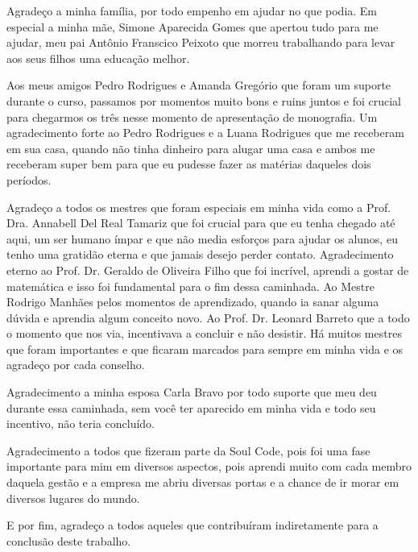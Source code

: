 


\begin{agradecimentos}







Agradeço a minha família, por todo empenho em ajudar no que podia. Em especial a minha mãe, Simone Aparecida Gomes que apertou tudo para me ajudar, meu pai Antônio Franscico Peixoto que morreu trabalhando para levar aos seus filhos uma educação melhor.

Aos meus amigos Pedro Rodrigues e Amanda Gregório que foram um suporte durante o curso, passamos por momentos muito bons e ruins juntos e foi crucial para chegarmos os três nesse momento de apresentação de monografia. Um agradecimento forte ao Pedro Rodrigues e a Luana Rodrigues que me receberam em sua casa, quando não tinha dinheiro para alugar uma casa e ambos me receberam super bem para que eu pudesse fazer as matérias daqueles dois períodos.

Agradeço a todos os mestres que foram especiais em minha vida como a Prof. Dra. Annabell Del Real Tamariz que foi crucial para que eu tenha chegado até aqui, um ser humano ímpar e que não media esforços para ajudar os alunos, eu tenho uma gratidão eterna e que jamais desejo perder contato. Agradecimento eterno ao Prof. Dr. Geraldo de Oliveira Filho que foi incrível, aprendi a gostar de matemática e isso foi fundamental para o fim dessa caminhada. Ao Mestre Rodrigo Manhães pelos momentos de aprendizado, quando ia sanar alguma dúvida e aprendia algum conceito novo. Ao Prof. Dr. Leonard Barreto que a todo o momento que nos via, incentivava a concluir e não desistir. Há muitos mestres que foram importantes e que ficaram marcados para sempre em minha vida e os agradeço por cada conselho.

Agradecimento a minha esposa Carla Bravo por todo suporte que meu deu durante essa caminhada, sem você ter aparecido em minha vida e todo seu incentivo, não teria concluído.

Agradecimento a todos que fizeram parte da Soul Code, pois foi uma fase importante para mim em diversos aspectos, pois aprendi muito com cada membro daquela gestão e a empresa me abriu diversas portas e a chance de ir morar em diversos lugares do mundo.

E por fim, agradeço a todos aqueles que contribuíram indiretamente para a conclusão deste trabalho.

\end{agradecimentos}
